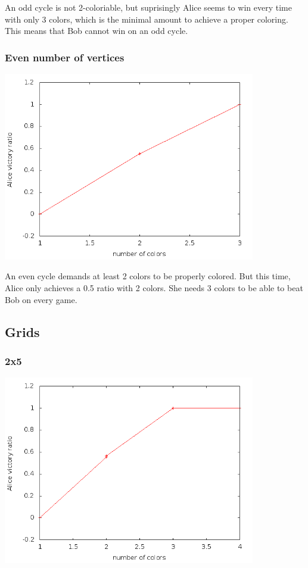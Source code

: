 An odd cycle is not 2-coloriable, but suprisingly Alice seems to win every time with only 3 colors, which is the minimal amount to achieve a proper coloring. This means that Bob cannot win on an odd cycle.

\subsubsection{Even number of vertices}

\includegraphics[width=11cm]{resultats/cyclepair.png}

An even cycle demands at least 2 colors to be properly colored. But this time, Alice only achieves a 0.5 ratio with 2 colors. She needs 3 colors to be able to beat Bob on every game.

\subsection{Grids}

\subsubsection{2x5}

\includegraphics[width=11cm]{resultats/grille25.png}

